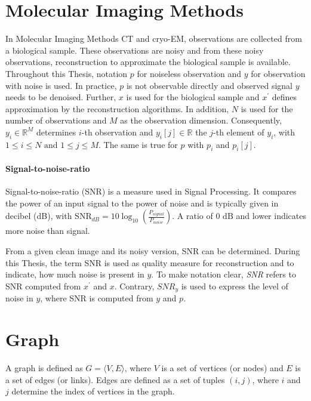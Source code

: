 \section{Molecular Imaging Methods}
In Molecular Imaging Methods CT and cryo-EM, observations are collected from a biological sample. 
These observations are noisy and from these noisy observations, reconstruction to approximate the biological sample is available.
Throughout this Thesis, notation $p$ for noiseless observation and $y$ for observation with noise is used.
In practice, $p$ is not observable directly and observed signal $y$ needs to be denoised.
Further, $x$ is used for the biological sample and $x^{\prime}$ defines approximation by the reconstruction algorithms.
In addition, $N$ is used for the number of observations and $M$ as the observation dimension.
Consequently, $y_i \in \mathbb{R}^M$ determines $i$-th observation and $y_i[j] \in \mathbb{R}$ the $j$-th element of $y_i$,
with $ 1 \leq i \leq N \text{ and } 1 \leq j \leq M$. The same is true for $p$ with $p_i$ and $p_i[j]$. 



\paragraph{Signal-to-noise-ratio}
Signal-to-noise-ratio (SNR) is a measure used in Signal Processing. 
It compares the power of an input signal to the power of noise and is typically given in decibel (dB), with
$\text{SNR}_{dB} = 10 \log_{10} \left(  \frac{P_{signal}}{P_{noise}} \right)$.
A ratio of 0 dB and lower indicates more noise than signal.

From a given clean image and its noisy version, SNR can be determined.
During this Thesis, the term SNR is used as quality measure for reconstruction and to indicate, how much noise is present in $y$.
To make notation clear, \textit{SNR} refers to SNR computed from $x^{\prime}$ and $x$.
Contrary, $\textit{SNR}_y$ is used to express the level of noise in $y$, 
where SNR is computed from $y$ and $p$.

\section{Graph}
A graph is defined as $G = \langle V,E \rangle$, where $V$ is a set of 
vertices (or nodes) and $E$ is a set of edges (or links). 
Edges are defined as a set of tuples $(i, j)$, where $i$ and $j$ determine 
the index of vertices in the graph.

